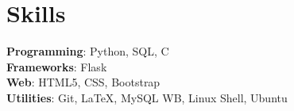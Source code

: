 \section*{\sc Skills}
\vspace{-2mm}
\hrulefill
\vspace{1mm}

\textbf{Programming}: Python, SQL, C\\
\textbf{Frameworks}: Flask\\
\textbf{Web}: HTML5, CSS, Bootstrap\\
\textbf{Utilities}: Git, \LaTeX, MySQL WB, Linux Shell, Ubuntu\\
